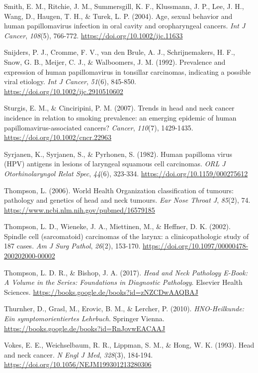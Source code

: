 Smith, E. M., Ritchie, J. M., Summersgill, K. F., Klussmann, J. P., Lee, J. H., Wang, D., Haugen, T. H., \& Turek, L. P. (2004). Age, sexual behavior and human papillomavirus infection in oral cavity and oropharyngeal cancers. \emph{Int J Cancer}, \emph{108}(5), 766-772. \url{https://doi.org/10.1002/ijc.11633}

Snijders, P. J., Cromme, F. V., van den Brule, A. J., Schrijnemakers, H. F., Snow, G. B., Meijer, C. J., \& Walboomers, J. M. (1992). Prevalence and expression of human papillomavirus in tonsillar carcinomas, indicating a possible viral etiology. \emph{Int J Cancer}, \emph{51}(6), 845-850. \url{https://doi.org/10.1002/ijc.2910510602}

Sturgis, E. M., \& Cinciripini, P. M. (2007). Trends in head and neck cancer incidence in relation to smoking prevalence: an emerging epidemic of human papillomavirus-associated cancers? \emph{Cancer}, \emph{110}(7), 1429-1435. \url{https://doi.org/10.1002/cncr.22963}

Syrjanen, K., Syrjanen, S., \& Pyrhonen, S. (1982). Human papilloma virus (HPV) antigens in lesions of laryngeal squamous cell carcinomas. \emph{ORL J Otorhinolaryngol Relat Spec}, \emph{44}(6), 323-334. \url{https://doi.org/10.1159/000275612}

Thompson, L. (2006). World Health Organization classification of tumours: pathology and genetics of head and neck tumours. \emph{Ear Nose Throat J}, \emph{85}(2), 74. \url{https://www.ncbi.nlm.nih.gov/pubmed/16579185}

Thompson, L. D., Wieneke, J. A., Miettinen, M., \& Heffner, D. K. (2002). Spindle cell (sarcomatoid) carcinomas of the larynx: a clinicopathologic study of 187 cases. \emph{Am J Surg Pathol}, \emph{26}(2), 153-170. \url{https://doi.org/10.1097/00000478-200202000-00002}

Thompson, L. D. R., \& Bishop, J. A. (2017). \emph{Head and Neck Pathology E-Book: A Volume in the Series: Foundations in Diagnostic Pathology}. Elsevier Health Sciences. \url{https://books.google.de/books?id=zNZCDwAAQBAJ}

Thurnher, D., Grasl, M., Erovic, B. M., \& Lercher, P. (2010). \emph{HNO-Heilkunde: Ein symptomorientiertes Lehrbuch}. Springer Vienna. \url{https://books.google.de/books?id=RnJovwEACAAJ}

Vokes, E. E., Weichselbaum, R. R., Lippman, S. M., \& Hong, W. K. (1993). Head and neck cancer. \emph{N Engl J Med}, \emph{328}(3), 184-194. \url{https://doi.org/10.1056/NEJM199301213280306}

